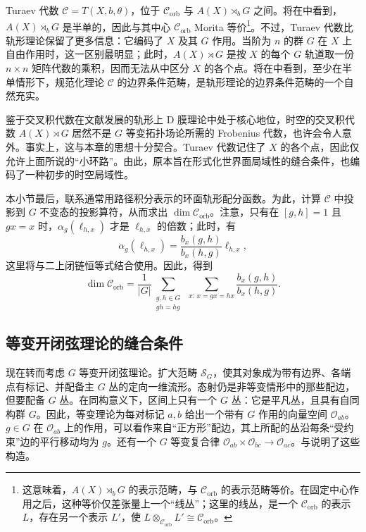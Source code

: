 Turaev 代数 $\mathcal{C}=T(X,b,\theta)$，位于 $\mathcal{C}_{\mathrm{orb}}$ 与 $A(X)\rtimes_bG$ 之间。将在中看到，$A(X)\rtimes_bG$ 是半单的，因此与其中心 $\mathcal{C}_{\mathrm{orb}}$ Morita 等价\footnote{这意味着，$A(X)\rtimes_bG$ 的表示范畴，与 $\mathcal{C}_{\mathrm{orb}}$ 的表示范畴等价。在固定中心作用之后，这种等价仅差张量上一个“线丛”；这里的线丛，是一个 $\mathcal{C}_{\mathrm{orb}}$ 的表示 $L$，存在另一个表示 $L'$，使 $L\otimes_{\mathcal{C}_{\mathrm{orb}}}L'\cong\mathcal{C}_{\mathrm{orb}}$。}。不过，Turaev 代数比轨形理论保留了更多信息：它编码了 $X$ 及其 $G$ 作用。当阶为 $n$ 的群 $G$ 在 $X$ 上自由作用时，这一区别最明显；此时，$A(X)\rtimes G$ 是按 $X$ 的每个 $G$ 轨道取一份 $n\times n$ 矩阵代数的乘积，因而无法从中区分 $X$ 的各个点。将在中看到，至少在半单情形下，规范化理论 $\mathcal{C}$ 的边界条件范畴，是轨形理论的边界条件范畴的一个自然充实。

鉴于交叉积代数在文献发展的轨形上 D 膜理论中处于核心地位，时空的交叉积代数 $A(X)\rtimes G$ 居然不是 $G$ 等变拓扑场论所需的 Frobenius 代数，也许会令人意外。事实上，这与本章的思想十分契合。Turaev 代数记住了 $X$ 的各个点，因此仅允许上面所说的“小环路”。由此，原本旨在形式化世界面局域性的缝合条件，也编码了一种初步的时空局域性。

本小节最后，联系通常用路径积分表示的环面轨形配分函数。为此，计算 $\mathcal{C}$ 中投影到 $G$ 不变态的投影算符，从而求出 $\dim\mathcal{C}_{\mathrm{orb}}$。注意，只有在 $[g,h]=1$ 且 $gx=x$ 时，$\alpha_g(\ell_{h,x})$ 才是 $\ell_{h,x}$ 的倍数；此时，有
\begin{equation}\label{eq:2.96}
\alpha_g(\ell_{h,x})=\frac{b_x(g,h)}{b_x(h,g)}\ell_{h,x},
\end{equation}
这里将与二上闭链恒等式结合使用。因此，得到
\begin{equation}\label{eq:2.97}
\dim\mathcal{C}_{\mathrm{orb}}=
\frac{1}{|G|}\sum_{\substack{g,h\in G\\gh=hg}}\ 
\sum_{x:\,x=gx=hx}\frac{b_x(g,h)}{b_x(h,g)}.
\end{equation}

\subsection{等变开闭弦理论的缝合条件}\label{sec:2.6.4}

现在转而考虑 $G$ 等变开闭弦理论。扩大范畴 $\mathcal{S}_G$，使其对象成为带有边界、各端点有标记、并配备主 $G$ 丛的定向一维流形。态射仍是非等变情形中的那些配边，但要配备 $G$ 丛。在同构意义下，区间上只有一个 $G$ 丛：它是平凡丛，且具有自同构群 $G$。因此，等变理论为每对标记 $a,b$ 给出一个带有 $G$ 作用的向量空间 $\mathcal{O}_{ab}$。$g\in G$ 在 $\mathcal{O}_{ab}$ 上的作用，可以看作来自“正方形”配边，其上所配的丛沿每条“受约束”边的平行移动均为 $g$。还有一个 $G$ 等变复合律 $\mathcal{O}_{ab}\times\mathcal{O}_{bc}\to\mathcal{O}_{ac}$。与说明了这些构造。

